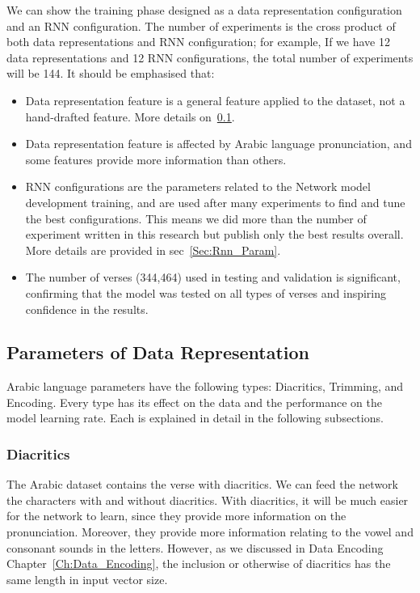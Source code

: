 We can show the training phase designed as a data representation configuration and an RNN configuration. The number of experiments is the cross product of both data representations and RNN configuration; for example, If we have 12 data representations and 12 RNN configurations, the total number of experiments will be 144. It should be emphasised that:

\begin{itemize}
 \item Data representation feature is a general feature applied to the dataset, not a hand-drafted feature. More details on~\ref{Sec:Data_Rep_Param}.
 \item Data representation feature is affected by Arabic language pronunciation, and some features provide more information than others.
 \item RNN configurations are the parameters related to the Network model development training, and are used after many experiments to find and tune the best configurations. This means we did more than the number of experiment written in this research but publish only the best results overall. More details are provided in sec~\ref{Sec:Rnn_Param}.
 \item The number of verses (344,464) used in testing and validation is significant, confirming that the model was tested on all types of verses and inspiring confidence in the results.

\end{itemize}

\subsection{Parameters of Data Representation}\label{Sec:Data_Rep_Param}

Arabic language parameters have the following types: Diacritics, Trimming, and Encoding. Every type has its effect on the data and the performance on the model learning rate. Each is explained in detail in the following subsections.

\subsubsection{Diacritics}

The Arabic dataset contains the verse with diacritics. We can feed the network the characters with and without diacritics. With diacritics, it will be much easier for the network to learn, since they provide more information on the pronunciation. Moreover, they provide more information relating to the vowel and consonant sounds in the letters. However, as we discussed in Data Encoding Chapter~\ref{Ch:Data_Encoding}, the inclusion or otherwise of diacritics has the same length in input vector size.


